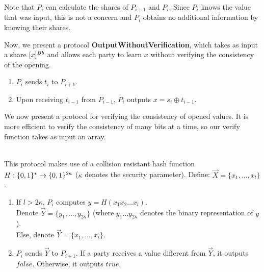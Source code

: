 Note that $P_i$ can calculate the shares of $P_{i+1}$ and $P_i$.
Since $P_i$ knows the value that was input, this is not a concern
and $P_i$ obtains no additional information by knowing their shares.

\noindent Now, we present a protocol {\bf OutputWithoutVerification}, which takes as input a share $[x]^{Bb}$ and allows each party to learn $x$ without verifying the consistency of the opening.

\begin{protocol}
    \begin{enumerate}
        \item $P_i$ sends $t_i$ to $P_{i + 1}$.
        \item Upon receiving $t_{i - 1}$ from $P_{i - 1}$, $P_i$ outputs $x = s_i \oplus t_{i - 1}$.
    \end{enumerate}
\end{protocol}

We now present a protocol for verifying the consistency of opened values.
It is more efficient to verify the consistency of many bits at a time,
so our verify function takes as input an array. 

\begin{protocol}
     \\ 
    This protocol makes use of a collision resistant hash function $H: \{0, 1\}^{\star} \rightarrow \{0, 1\}^{2 \kappa}$ ($\kappa$ denotes the security parameter).
    Define: $\vec{X} = \{x_1, \ldots, x_l\}$.
    \begin{enumerate}
        \item If $l > 2 \kappa$, $P_i$ computes $y = H(x_1 x_2 \ldots x_l)$. \\
        Denote $\vec{Y} = \{y_1, \ldots, y_{2\kappa}\}$ (where $y_1 \ldots y_{2\kappa}$ denotes the binary representation of $y$). \\
        Else, denote $\vec{Y} = \{x_1, \ldots, x_l\}$.
        \item $P_i$ sends $\vec{Y}$ to $P_{i + 1}$. 
        If a party receives a value different from $\vec{Y}$, it outputs $false$.
        Otherwise, it outputs $true$.
    \end{enumerate}
\end{protocol}
